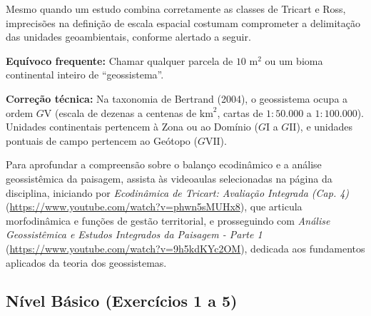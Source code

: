
Mesmo quando um estudo combina corretamente as classes de Tricart e Ross, imprecisões na definição de escala espacial costumam comprometer a delimitação das unidades geoambientais, conforme alertado a seguir.

\begin{boxErro}
\textbf{Equívoco frequente:} Chamar qualquer parcela de $10\text{ m}^2$ ou um bioma continental inteiro de ``geossistema''.\par
\textbf{Correção técnica:} Na taxonomia de Bertrand (2004), o geossistema ocupa a ordem $G\text{V}$ (escala de dezenas a centenas de $\text{km}^2$, cartas de $1:50.000$ a $1:100.000$). Unidades continentais pertencem à Zona ou ao Domínio ($G\text{I}$ a $G\text{II}$), e unidades pontuais de campo pertencem ao Geótopo ($G\text{VII}$).
\end{boxErro}

Para aprofundar a compreensão sobre o balanço ecodinâmico e a análise geossistêmica da paisagem, assista às videoaulas selecionadas na página da disciplina, iniciando por \textit{Ecodinâmica de Tricart: Avaliação Integrada (Cap. 4)} (\url{https://www.youtube.com/watch?v=phwn5sMUHx8}), que articula morfodinâmica e funções de gestão territorial, e prosseguindo com \textit{Análise Geossistêmica e Estudos Integrados da Paisagem - Parte 1} (\url{https://www.youtube.com/watch?v=9h5kdKYc2OM}), dedicada aos fundamentos aplicados da teoria dos geossistemas.


\subsection*{Nível Básico (Exercícios 1 a 5)}

